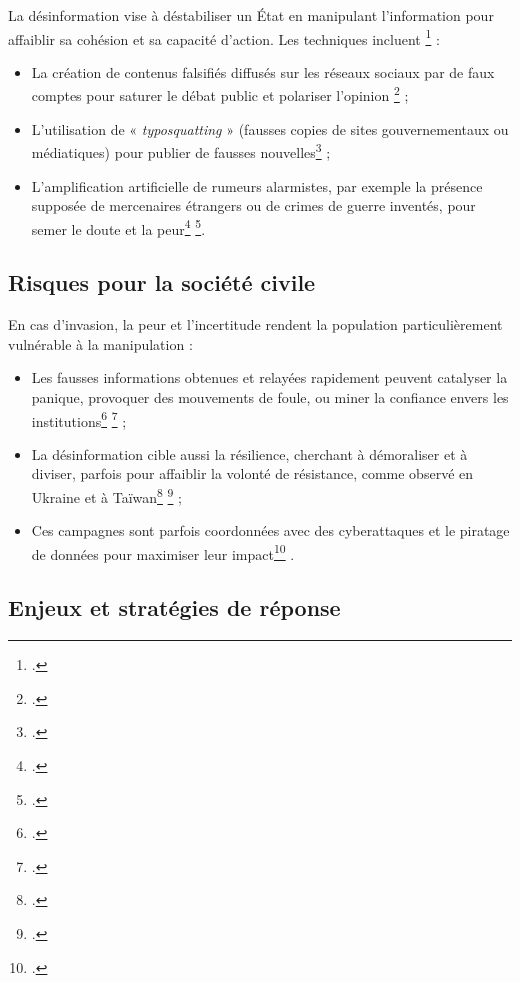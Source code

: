 \documentclass[12pt,a4paper]{article}
\begin{document}
La désinformation vise à déstabiliser un État en manipulant l'information pour affaiblir sa cohésion et sa capacité d'action. Les techniques incluent \footcite{rdn2020desinformation} :
\begin{itemize}
\item La création de contenus falsifiés diffusés sur les réseaux sociaux par de faux comptes pour saturer le débat public et polariser l'opinion \footcite{garrigou2025desinformation} ;
\item L'utilisation de « \textit{typosquatting} » (fausses copies de sites gouvernementaux ou médiatiques) pour publier de fausses nouvelles\footcite{garrigou2025desinformation} ;
\item L'amplification artificielle de rumeurs alarmistes, par exemple la présence supposée de mercenaires étrangers ou de crimes de guerre inventés, pour semer le doute et la peur\footcite{ministere2025infox} \footcite{tf1info2025desinformation}.
\end{itemize}

\subsection{Risques pour la société civile}

En cas d'invasion, la peur et l'incertitude rendent la population particulièrement vulnérable à la manipulation :

\begin{itemize}
\item Les fausses informations obtenues et relayées rapidement peuvent catalyser la panique, provoquer des mouvements de foule, ou miner la confiance envers les institutions\footcite{rdn2020desinformation} \footcite{garrigou2025desinformation} ;
\item La désinformation cible aussi la résilience, cherchant à démoraliser et à diviser, parfois pour affaiblir la volonté de résistance, comme observé en Ukraine et à Taïwan\footcite{garrigou2025desinformation} \footcite{tf1info2025desinformation} ;
\item Ces campagnes sont parfois coordonnées avec des cyberattaques et le piratage de données pour maximiser leur impact\footcite{roblesfernandez2023desinformation} .
\end{itemize}

\subsection{Enjeux et stratégies de réponse}
\end{document}
